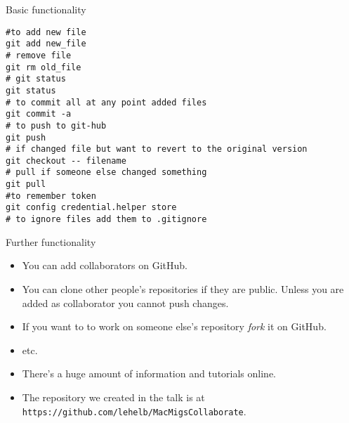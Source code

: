\documentclass{beamer}
\begin{document}
 \begin{frame}[fragile]{Basic functionality}
\begin{verbatim}
#to add new file
git add new_file
# remove file
git rm old_file
# git status
git status
# to commit all at any point added files
git commit -a
# to push to git-hub
git push
# if changed file but want to revert to the original version
git checkout -- filename
# pull if someone else changed something
git pull
#to remember token
git config credential.helper store
# to ignore files add them to .gitignore
\end{verbatim}
 \end{frame}

 \begin{frame}{Further functionality}
   \begin{itemize}
   \item You can add collaborators on GitHub. 
   \item You can clone other people's repositories if they are public. Unless you are added as collaborator you cannot push changes.
\item If you want to to work on someone else's repository {\em fork} it on GitHub.
\item etc.
\item There's a huge amount of information and tutorials online.
\item The repository we created in the talk is at \texttt{https://github.com/lehelb/MacMigsCollaborate}.
   \end{itemize}
 \end{frame}
\end{document}
